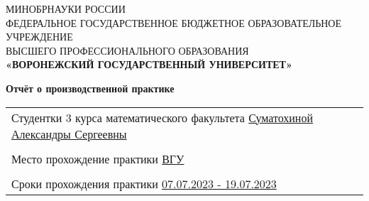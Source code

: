 \thispagestyle{empty}
\begin{center}
	\hfill \break
	\large{МИНОБРНАУКИ РОССИИ}\\
	\footnotesize{ФЕДЕРАЛЬНОЕ ГОСУДАРСТВЕННОЕ БЮДЖЕТНОЕ ОБРАЗОВАТЕЛЬНОЕ УЧРЕЖДЕНИЕ}\\
	\footnotesize{ВЫСШЕГО ПРОФЕССИОНАЛЬНОГО ОБРАЗОВАНИЯ}\\
	\small{\textbf{«ВОРОНЕЖСКИЙ ГОСУДАРСТВЕННЫЙ УНИВЕРСИТЕТ»}}\\

	\hfill \break
	\hfill \break
	\hfill \break
	\hfill \break
	\hfill \break
	\hfill \break
	\hfill \break
	\hfill \break
	\hfill \break

	\large\textbf{Отчёт о производственной практике}\\
\end{center}

\hfill \break
\hfill \break
\hfill \break
\hfill \break
\hfill \break
\hfill \break
\hfill \break


\begin{tabular}{p{}}
	Студентки 3 курса математического факультета \newline
	\underline{Суматохиной Александры Сергеевны} \\
	\\
	Место прохождение практики
	\underline{ВГУ}                              \\
	\\
	Сроки прохождения практики \underline{07.07.2023 - 19.07.2023}
\end{tabular}

\hfill \break
\hfill \break
\hfill \break
\hfill \break
\hfill \break
\hfill \break
\hfill \break
\hfill \break
\hfill \break
\hfill \break
\hfill \break

\newpage